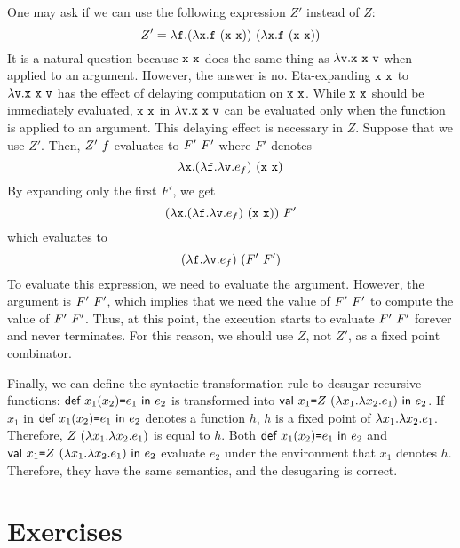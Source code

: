 One may ask if we can use the following expression $Z'$ instead of $Z$:
\[
  Z'=\efun{\cf}{\eapp
    {(\efun{\cx}{\eapp{\cf}{(\eapp{\cx}{\cx})}})}
    {(\efun{\cx}{\eapp{\cf}{(\eapp{\cx}{\cx})}})}
  }
\]
It is a natural question because $\texttt{x}\ \texttt{x}$ does the same thing as
$\lambda\texttt{v}.\texttt{x}\ \texttt{x}\ \texttt{v}$ when applied to an argument. However,
the answer is no. Eta-expanding $\texttt{x}\ \texttt{x}$ to $\lambda\texttt{v}.\texttt{x}\ \texttt{x}\ \texttt{v}$
has the effect of delaying computation on $\texttt{x}\ \texttt{x}$. While
$\texttt{x}\ \texttt{x}$ should be immediately evaluated, $\texttt{x}\ \texttt{x}$ in
$\lambda\texttt{v}.\texttt{x}\ \texttt{x}\ \texttt{v}$ can be evaluated only when the
function is applied to
an argument. This delaying effect is necessary in $Z$. Suppose that we use $Z'$.
Then, $Z'\ f$ evaluates to $F'\ F'$
where $F'$ denotes
\[
  \lambda\texttt{x}.(\lambda\texttt{f}.\lambda\texttt{v}.e_f)\ (\texttt{x}\ \texttt{x})
\]
By expanding only the first $F'$, we get
\[
  (\lambda\texttt{x}.(\lambda\texttt{f}.\lambda\texttt{v}.e_f)\ (\texttt{x}\ \texttt{x}))\ F'
\]
which evaluates to
\[
  (\lambda\texttt{f}.\lambda\texttt{v}.e_f)\ (F'\ F')
\]
To evaluate this expression, we need to evaluate the argument. However, the
argument is $F'\ F'$, which implies that we need the value of
$F'\ F'$ to compute the value of $F'\ F'$. Thus, at this point,
the execution starts to evaluate $F'\ F'$ forever and never terminates.
For this reason, we should use $Z$, not $Z'$, as a fixed point combinator.

Finally, we can define the syntactic transformation rule to desugar recursive
functions: $\textsf{def}\ x_1(x_2)\texttt{=} e_1\ \textsf{in}\ e_2$ is transformed into
$\textsf{val}\ x_1\texttt{=}Z\ (\lambda x_1.\lambda x_2.e_1)\ \textsf{in}\ e_2$.
If $x_1$ in $\textsf{def}\ x_1(x_2)\texttt{=} e_1\ \textsf{in}\ e_2$ denotes a function $h$, $h$ is a fixed
point of $\lambda x_1.\lambda x_2.e_1$. Therefore,
$Z\ (\lambda x_1.\lambda x_2.e_1)$ is equal to $h$.
Both $\textsf{def}\ x_1(x_2)\texttt{=} e_1\ \textsf{in}\ e_2$ and $\textsf{val}\ x_1\texttt{=}Z\ (\lambda x_1.\lambda x_2.e_1)\ \textsf{in}\ e_2$
evaluate $e_2$ under the environment that $x_1$ denotes $h$. Therefore, they
have the same semantics, and the desugaring is correct.

\section{Exercises}

